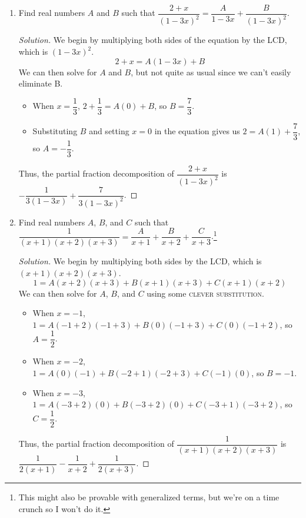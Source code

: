 \documentclass{article}
\newenvironment{solution}
  {\renewcommand\qedsymbol{$\blacksquare$}\begin{proof}[Solution]}
  {\end{proof}}
\begin{document}
\begin{enumerate}
{\begin{minipage}[t]{0.98\textwidth}
\begin{proof}
        \end{proof} 
    \end{minipage}%
    }
    \item Find real numbers $A$ and $B$ such that $\dfrac{2+x}{{(1-3x)}^2} = \dfrac{A}{1-3x} + \dfrac{B}{{(1-3x)}^2}$.\begin{solution} 
        We begin by multiplying both sides of the equation by the LCD, which is ${(1-3x)}^2$.\[
            2+x = A(1-3x) + B     
        \] We can then solve for $A$ and $B$, but not quite as usual since we can't easily eliminate B.\begin{itemize} 
            \item When $x=\dfrac{1}{3}$, $2+ \dfrac{1}{3} = A(0) + B$, so $B=\dfrac{7}{3}$. 
            \item Substituting $B$ and setting $x=0$ in the equation gives us $2 = A(1) + \dfrac{7}{3}$, so $A=-\dfrac{1}{3}$. 
        \end{itemize} Thus, the partial fraction decomposition of $\dfrac{2+x}{{(1-3x)}^2}$ is $-\dfrac{1}{3(1-3x)} + \dfrac{7}{3{(1-3x)}^2}$. 
    \end{solution} 
    \item Find real numbers $A$, $B$, and $C$ such that $\dfrac{1}{(x+1)(x+2)(x+3)} = \dfrac{A}{x+1} + \dfrac{B}{x+2} + \dfrac{C}{x+3}$.\footnote{This might also be provable with generalized terms, but we're on a time crunch so I won't do it.} 
    \begin{solution} 
        We begin by multiplying both sides by the LCD, which is $(x+1)(x+2)(x+3)$.\[
            1 = A(x+2)(x+3) + B(x+1)(x+3) + C(x+1)(x+2)   
        \] We can then solve for $A$, $B$, and $C$ using some \textsc{clever substitution}.\begin{itemize} 
            \item When $x=-1$, $1= A(-1+2)(-1+3) + B(0)(-1+3) + C(0)(-1+2)$, so $A= \dfrac{1}{2}$. 
            \item When $x=-2$, $1= A(0)(-1) + B(-2+1)(-2+3) + C(-1)(0)$, so $B= -1$. 
            \item When $x=-3$, $1= A(-3+2)(0) + B(-3+2)(0) + C(-3+1)(-3+2)$, so $C= \dfrac{1}{2}$. 
        \end{itemize} Thus, the partial fraction decomposition of $\dfrac{1}{(x+1)(x+2)(x+3)}$ is $\dfrac{1}{2(x+1)} - \dfrac{1}{x+2} + \dfrac{1}{2(x+3)}$.
    \end{solution}
    \parindent=2pt
    \colorbox{CornflowerBlue}{
    \begin{minipage}[c]{0.9\textwidth}

\end{minipage}}
\end{enumerate}
\end{document}
